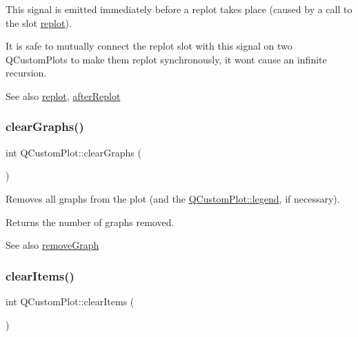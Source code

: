 This signal is emitted immediately before a replot takes place (caused by a call to the slot \mbox{\hyperlink{class_q_custom_plot_a606fd384b2a637ce2c24899bcbde77d6}{replot}}).

It is safe to mutually connect the replot slot with this signal on two Q\+Custom\+Plots to make them replot synchronously, it won\textquotesingle{}t cause an infinite recursion.

\begin{DoxySeeAlso}{See also}
\mbox{\hyperlink{class_q_custom_plot_a606fd384b2a637ce2c24899bcbde77d6}{replot}}, \mbox{\hyperlink{class_q_custom_plot_a6f4fa624af060bc5919c5f266cf426a0}{after\+Replot}} 
\end{DoxySeeAlso}
\mbox{\label{class_q_custom_plot_ab0f3abff2d2f7df3668b5836f39207fa}} 
\subsubsection{\texorpdfstring{clear\+Graphs()}{clearGraphs()}}
{\footnotesize\ttfamily int Q\+Custom\+Plot\+::clear\+Graphs (\begin{DoxyParamCaption}{ }\end{DoxyParamCaption})}

Removes all graphs from the plot (and the \mbox{\hyperlink{class_q_custom_plot_a4eadcd237dc6a09938b68b16877fa6af}{Q\+Custom\+Plot\+::legend}}, if necessary).

Returns the number of graphs removed.

\begin{DoxySeeAlso}{See also}
\mbox{\hyperlink{class_q_custom_plot_a903561be895fb6528a770d66ac5e6713}{remove\+Graph}} 
\end{DoxySeeAlso}
\mbox{\label{class_q_custom_plot_abdfd07d4f0591d0cf967f85013fd3645}} 
\subsubsection{\texorpdfstring{clear\+Items()}{clearItems()}}
{\footnotesize\ttfamily int Q\+Custom\+Plot\+::clear\+Items (\begin{DoxyParamCaption}{ }\end{DoxyParamCaption})}

